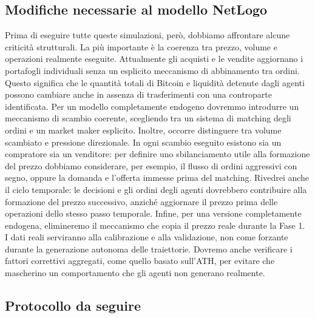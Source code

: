 \subsection{Modifiche necessarie al modello NetLogo}
Prima di eseguire tutte queste simulazioni, però, dobbiamo affrontare alcune criticità strutturali.
La più importante è la coerenza tra prezzo, volume e operazioni realmente eseguite.
Attualmente gli acquisti e le vendite aggiornano i portafogli individuali senza un esplicito meccanismo di abbinamento tra ordini. Questo significa 
che le quantità totali di Bitcoin e liquidità detenute dagli agenti possono cambiare anche in assenza di trasferimenti con una controparte identificata.
Per un modello completamente endogeno dovremmo introdurre un meccanismo di scambio coerente, scegliendo tra un sistema di matching degli ordini e un 
market maker esplicito. Inoltre, occorre distinguere tra volume scambiato e pressione direzionale. In ogni scambio eseguito esistono sia un compratore 
sia un venditore: per definire uno sbilanciamento utile alla formazione del prezzo dobbiamo considerare, per esempio, il flusso di ordini aggressivi 
con segno, oppure la domanda e l'offerta immesse prima del matching. Rivedrei anche il ciclo temporale: le decisioni e gli ordini degli agenti 
dovrebbero contribuire alla formazione del prezzo successivo, anziché aggiornare il prezzo prima delle operazioni dello stesso passo temporale.
Infine, per una versione completamente endogena, elimineremo il meccanismo che copia il prezzo reale durante la Fase 1. I dati reali serviranno 
alla calibrazione e alla validazione, non come forzante durante la generazione autonoma delle traiettorie. Dovremo anche verificare i fattori 
correttivi aggregati, come quello basato sull'ATH, per evitare che mascherino un comportamento che gli agenti non generano realmente.

\subsection{Protocollo da seguire}

